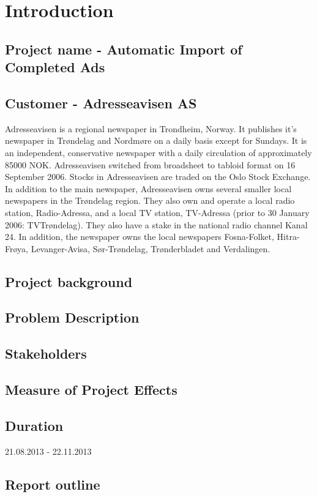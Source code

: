 \section{Introduction}
\subsection{Project name - Automatic Import of Completed Ads}
\subsection{Customer - Adresseavisen AS}
Adresseavisen is a regional newspaper in Trondheim, Norway. It publishes it's newspaper in Trøndelag and Nordmøre on a daily basis except for Sundays. It is an independent, conservative newspaper with a daily circulation of approximately 85000 NOK. 
Adresseavisen switched from broadsheet to tabloid format on 16 September 2006. Stocks in Adresseavisen are traded on the Oslo Stock Exchange.\\
In addition to the main newspaper, Adresseavisen owns several smaller local newspapers in the Trøndelag region. They also own and operate a local radio station, Radio-Adressa, and a local TV station, TV-Adressa (prior to 30 January 2006: TVTrøndelag). They also have a stake in the national radio channel Kanal 24. In addition, the newspaper owns the local newspapers Fosna-Folket, Hitra-Frøya, Levanger-Avisa, Sør-Trøndelag, Trønderbladet and Verdalingen. \cite{adressaWiki.org}


\subsection{Project background}
\subsection{Problem Description}
\subsection{Stakeholders}
\subsection{Measure of Project Effects}
\subsection{Duration}
21.08.2013 - 22.11.2013
\subsection{Report outline}